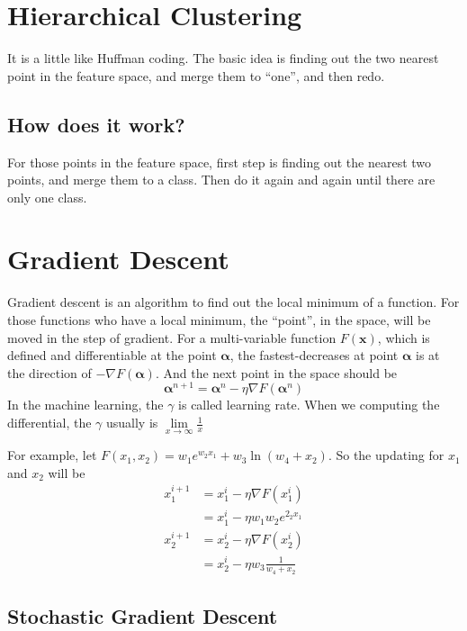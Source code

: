 \documentclass{article}
\begin{document}
\section{Hierarchical Clustering}
\label{sec:hc}

It is a little like Huffman coding. The basic idea is finding out the two nearest point in the feature space, and merge them to ``one'', and then redo.

\subsection{How does it work?}
\label{sec:hc:how}

For those points in the feature space, first step is finding out the nearest two points, and merge them to a class.
Then do it again and again until there are only one class. 

\section{Gradient Descent}
\label{sec:gd}

Gradient descent is an algorithm to find out the local minimum of a function. For those functions who have a local minimum,
the ``point'', in the space, will be moved in the step of gradient.
For a multi-variable function $F(\mathbf{x})$, which is defined and differentiable at the point $\mathbf{\alpha}$, 
the fastest-decreases at point $\mathbf{\alpha}$ is at the direction of $-\nabla F(\mathbf{\alpha})$.
And the next point in the space should be
\begin{equation}
	\label{eq:gd:next}
	\mathbf{\alpha}^{n+1} = \mathbf{\alpha}^n - \eta\nabla F(\mathbf{\alpha}^n)
\end{equation}
In the machine learning, the $\gamma$ is called learning rate. When we computing the differential, the $\gamma$ usually is $\lim\limits_{x \rightarrow \infty} \frac{1}{x}$

For example, let $F(x_1,x_2)=w_1e^{w_2x_1}+w_3\ln(w_4+x_2)$. So the updating for $x_1$ and $ x_2$ will be 
\begin{align*}
x_1^{i+1} &= x_1^i - \eta\nabla F(x_1^i) \\ &= x_1^i - \eta w_1w_2e^{2_2x_1} \\
x_2^{i+1} &= x_2^i - \eta\nabla F(x_2^i) \\ &= x_2^i -\eta w_3\frac{1}{w_4+x_2}
\end{align*}

\subsection{Stochastic Gradient Descent}
\label{aec:gd:sgd}
\end{document}
